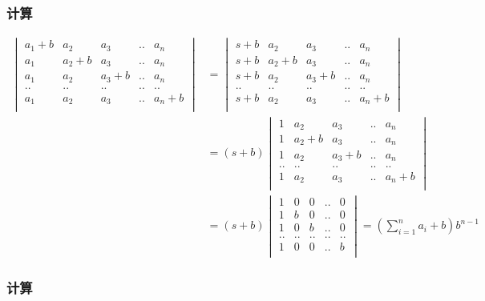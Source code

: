 \documentclass[12pt,a4paper]{ctexart}
\begin{document}
\subsubsection{计算}

\begin{align*}
\begin{vmatrix}
    a_1 + b & a_2 & a_3 & .. & a_n \\
    a_1 & a_2 + b & a_3 & .. & a_n \\
    a_1 & a_2  & a_3 + b & .. & a_n \\
    .. & .. &.. &.. &.. \\
    a_1 & a_2  & a_3 & .. & a_n + b \\
\end{vmatrix} &= \begin{vmatrix}
    s + b & a_2 & a_3 & .. & a_n \\
    s + b & a_2 + b & a_3 & .. & a_n \\
    s + b & a_2  & a_3 + b & .. & a_n \\
    .. & .. &.. &.. &.. \\
    s + b & a_2  & a_3 & .. & a_n + b \\
\end{vmatrix} \\
&= (s+b)\begin{vmatrix}
    1 & a_2 & a_3 & .. & a_n \\
    1 & a_2 + b & a_3 & .. & a_n \\
    1 & a_2  & a_3 + b & .. & a_n \\
    .. & .. &.. &.. &.. \\
    1 & a_2  & a_3 & .. & a_n + b \\
\end{vmatrix} \\
&= (s+b)\begin{vmatrix}
    1 & 0 & 0 & .. & 0 \\
    1 & b & 0 & .. & 0 \\
    1 & 0  &  b & .. & 0 \\
    .. & .. &.. &.. &.. \\
    1 & 0  & 0 & .. &   b \\
\end{vmatrix} = (\sum_{i=1}^{n}a_i + b)b^{n-1}
\end{align*}

\subsubsection{计算}
\end{document}

